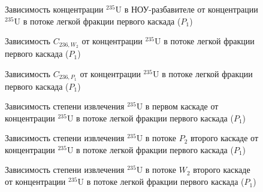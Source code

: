 \begin{figure}[ht]
    \centering
    \begin{minipage}{.5\textwidth}
      \centering
      
\caption{{Зависимость концентрации $^{235}$U в НОУ-разбавителе от концентрации $^{235}$U в потоке легкой фракции первого каскада ($P_1$){\label{C235P0}}}}
\end{minipage}
\end{figure}

\begin{figure}[ht]
    \centering
    \begin{minipage}{.5\textwidth}
      \centering
      
      \caption{{Зависимость $C_{236,W_2}$ от концентрации $^{235}$U в потоке легкой фракции первого каскада ($P_1$){\label{C236W2}}}}
    \end{minipage}%
    \begin{minipage}{.5\textwidth}
      \centering
      
      \caption{{Зависимость $C_{236,P_1}$ от концентрации $^{235}$U в потоке легкой фракции первого каскада ($P_1$){\label{C236P1}}}}
  \end{minipage}
  \end{figure}

\begin{figure}[ht]
    \centering
      
    \caption{Зависимость степени извлечения $^{235}$U в первом каскаде от концентрации $^{235}$U в потоке легкой фракции первого каскада ($P_1$)}\label{ex1P1}
\end{figure}

\begin{figure}[ht]
    \centering
    \begin{minipage}{.5\textwidth}
        \centering
        
  \caption{{Зависимость степени извлечения $^{235}$U в потоке $P_2$ второго каскаде от концентрации $^{235}$U в потоке легкой фракции первого каскада ($P_1$){\label{EX_P2}}}}
  \end{minipage}%
    \begin{minipage}{.5\textwidth}
      \centering
      
\caption{{Зависимость степени извлечения $^{235}$U в потоке $W_2$ второго каскаде от концентрации $^{235}$U в потоке легкой фракции первого каскада ($P_1$){\label{EX_W2}}}}
    \end{minipage}
\end{figure}


